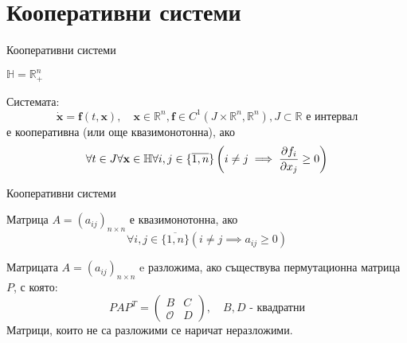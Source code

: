 \section{Кооперативни системи}
\begin{frame}[t]{Кооперативни системи}
  \begin{definition}
    $\mathbb{H} = \mathbb{R}_{+}^n$
  \end{definition}
  \begin{definition}
    \label{def:Cooperative}
    Системата:
    \begin{equation}
      \label{eq:Cooperative}
      \dot{\mathbf{x}} = \mathbf{f}(t, \mathbf{x}),  \quad \mathbf{x} \in \mathbb{R}^n, \mathbf{f} \in C^1(J \times \mathbb{R}^n, \mathbb{R}^n), J \subset \mathbb{R} \text{ е интервал}
    \end{equation}
    е кооперативна (или още квазимонотонна), ако
    \begin{equation}
      \forall{t \in J}\forall{\mathbf{x} \in \mathbb{H}}\forall{i,j \in \{\overline{1,n}\}}\left(i \neq j \implies \pdv{f_i}{x_j}(t, \mathbf{x}) \geq 0\right)
    \end{equation}
  \end{definition}

\end{frame}

\begin{frame}[t]{Кооперативни системи}
  \begin{definition}
    Матрица $A=(a_{ij})_{n \times n}$ е квазимонотонна, ако
    \begin{equation*}
      \forall{i,j \in \{\overline{1,n}\}} \left(i \neq j \implies a_{ij} \geq 0\right)
    \end{equation*}
  \end{definition}
  \begin{definition}
    Матрицата $A=(a_{ij})_{n \times n}$ e разложима, ако съществува пермутационна матрица $P$, с която:
    \begin{equation*}
      PAP^T =
      \begin{pmatrix}
        B & C \\
        \mathscr{O} & D
      \end{pmatrix}, \quad B, D \text{ - квадратни}
    \end{equation*}
    Матрици, които не са разложими се наричат неразложими.
  \end{definition}
\end{frame}

